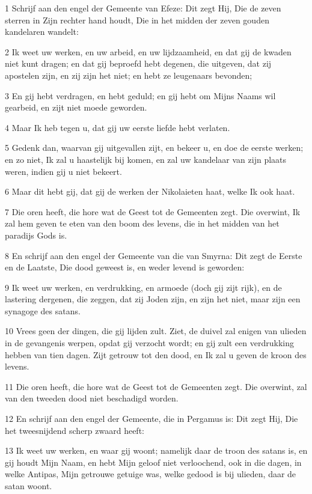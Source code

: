 \par 1 Schrijf aan den engel der Gemeente van Efeze: Dit zegt Hij, Die de zeven sterren in Zijn rechter hand houdt, Die in het midden der zeven gouden kandelaren wandelt:
\par 2 Ik weet uw werken, en uw arbeid, en uw lijdzaamheid, en dat gij de kwaden niet kunt dragen; en dat gij beproefd hebt degenen, die uitgeven, dat zij apostelen zijn, en zij zijn het niet; en hebt ze leugenaars bevonden;
\par 3 En gij hebt verdragen, en hebt geduld; en gij hebt om Mijns Naams wil gearbeid, en zijt niet moede geworden.
\par 4 Maar Ik heb tegen u, dat gij uw eerste liefde hebt verlaten.
\par 5 Gedenk dan, waarvan gij uitgevallen zijt, en bekeer u, en doe de eerste werken; en zo niet, Ik zal u haastelijk bij komen, en zal uw kandelaar van zijn plaats weren, indien gij u niet bekeert.
\par 6 Maar dit hebt gij, dat gij de werken der Nikolaieten haat, welke Ik ook haat.
\par 7 Die oren heeft, die hore wat de Geest tot de Gemeenten zegt. Die overwint, Ik zal hem geven te eten van den boom des levens, die in het midden van het paradijs Gods is.
\par 8 En schrijf aan den engel der Gemeente van die van Smyrna: Dit zegt de Eerste en de Laatste, Die dood geweest is, en weder levend is geworden:
\par 9 Ik weet uw werken, en verdrukking, en armoede (doch gij zijt rijk), en de lastering dergenen, die zeggen, dat zij Joden zijn, en zijn het niet, maar zijn een synagoge des satans.
\par 10 Vrees geen der dingen, die gij lijden zult. Ziet, de duivel zal enigen van ulieden in de gevangenis werpen, opdat gij verzocht wordt; en gij zult een verdrukking hebben van tien dagen. Zijt getrouw tot den dood, en Ik zal u geven de kroon des levens.
\par 11 Die oren heeft, die hore wat de Geest tot de Gemeenten zegt. Die overwint, zal van den tweeden dood niet beschadigd worden.
\par 12 En schrijf aan den engel der Gemeente, die in Pergamus is: Dit zegt Hij, Die het tweesnijdend scherp zwaard heeft:
\par 13 Ik weet uw werken, en waar gij woont; namelijk daar de troon des satans is, en gij houdt Mijn Naam, en hebt Mijn geloof niet verloochend, ook in die dagen, in welke Antipas, Mijn getrouwe getuige was, welke gedood is bij ulieden, daar de satan woont.
